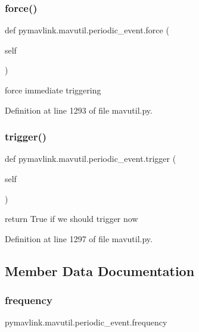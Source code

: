 \subsubsection{\texorpdfstring{force()}{force()}}
{\footnotesize\ttfamily def pymavlink.\+mavutil.\+periodic\+\_\+event.\+force (\begin{DoxyParamCaption}\item[{}]{self }\end{DoxyParamCaption})}

\begin{DoxyVerb}force immediate triggering\end{DoxyVerb}
 

Definition at line 1293 of file mavutil.\+py.

\mbox{\label{classpymavlink_1_1mavutil_1_1periodic__event_ae4845b6df5d98c26357ca74346df1363}} 
\subsubsection{\texorpdfstring{trigger()}{trigger()}}
{\footnotesize\ttfamily def pymavlink.\+mavutil.\+periodic\+\_\+event.\+trigger (\begin{DoxyParamCaption}\item[{}]{self }\end{DoxyParamCaption})}

\begin{DoxyVerb}return True if we should trigger now\end{DoxyVerb}
 

Definition at line 1297 of file mavutil.\+py.



\subsection{Member Data Documentation}
\mbox{\label{classpymavlink_1_1mavutil_1_1periodic__event_aa08aac52084bedb4cefac51ee2421e99}} 
\subsubsection{\texorpdfstring{frequency}{frequency}}
{\footnotesize\ttfamily pymavlink.\+mavutil.\+periodic\+\_\+event.\+frequency}



